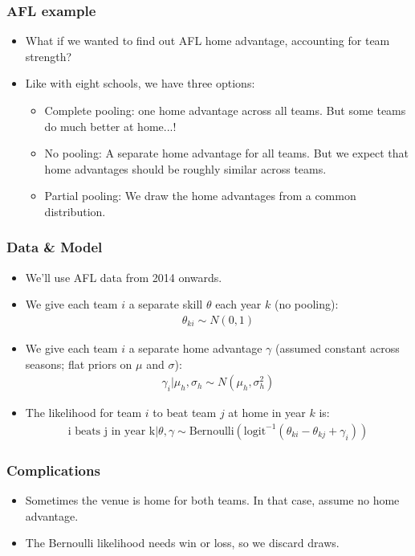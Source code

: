 \documentclass{beamer}
\begin{document}
\begin{frame}
	\frametitle{AFL example}
	\begin{itemize}
		\item What if we wanted to find out AFL home advantage, accounting for team strength?
		\item Like with eight schools, we have three options:
		\begin{itemize}
			\item Complete pooling: one home advantage across all teams. But some teams do much better at home...!
			\item No pooling: A separate home advantage for all teams. But we expect that home advantages should be roughly similar across teams.
			\item Partial pooling: We draw the home advantages from a common distribution.
		\end{itemize}
	\end{itemize}
\end{frame}

\begin{frame}
\frametitle{Data \& Model}
\begin{itemize}
	\item We'll use AFL data from 2014 onwards.
	\item We give each team $i$ a separate skill $\theta$ each year $k$ (no pooling):
	\begin{align*}
		\theta_{ki} \sim N(0, 1)
	\end{align*}
	\item We give each team $i$ a separate home advantage $\gamma$ (assumed constant across seasons; flat priors on $\mu$ and $\sigma$):
	\begin{align*}
		\gamma_i | \mu_h, \sigma_h \sim N(\mu_h, \sigma_h^2)
	\end{align*}
	\item The likelihood for team $i$ to beat team $j$ at home in year $k$ is:
	\begin{align*}
		\textrm{i beats j in year k}|\theta, \gamma \sim \textrm{Bernoulli}(\textrm{logit}^{-1}(\theta_{ki} - \theta_{kj} + \gamma_i))
	\end{align*}
\end{itemize}
\end{frame}

\begin{frame}
	\frametitle{Complications}
	\begin{itemize}
		\item Sometimes the venue is home for both teams. In that case, assume no home advantage.
		\item The Bernoulli likelihood needs win or loss, so we discard draws.
	\end{itemize}
\end{frame}
\end{document}
